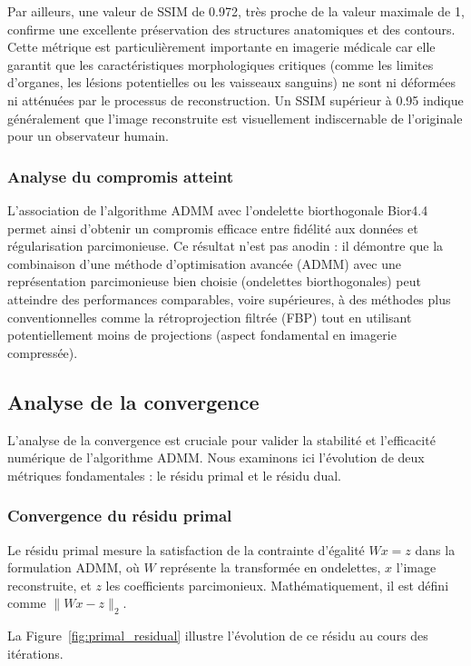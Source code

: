 Par ailleurs, une valeur de SSIM de 0.972, très proche de la valeur maximale de 1, confirme une excellente préservation des structures anatomiques et des contours. Cette métrique est particulièrement importante en imagerie médicale car elle garantit que les caractéristiques morphologiques critiques (comme les limites d'organes, les lésions potentielles ou les vaisseaux sanguins) ne sont ni déformées ni atténuées par le processus de reconstruction. Un SSIM supérieur à 0.95 indique généralement que l'image reconstruite est visuellement indiscernable de l'originale pour un observateur humain.

\subsubsection{Analyse du compromis atteint}
L'association de l'algorithme ADMM avec l'ondelette biorthogonale Bior4.4 permet ainsi d'obtenir un compromis efficace entre fidélité aux données et régularisation parcimonieuse. Ce résultat n'est pas anodin : il démontre que la combinaison d'une méthode d'optimisation avancée (ADMM) avec une représentation parcimonieuse bien choisie (ondelettes biorthogonales) peut atteindre des performances comparables, voire supérieures, à des méthodes plus conventionnelles comme la rétroprojection filtrée (FBP) tout en utilisant potentiellement moins de projections (aspect fondamental en imagerie compressée).

\subsection{Analyse de la convergence}

L'analyse de la convergence est cruciale pour valider la stabilité et l'efficacité numérique de l'algorithme ADMM. Nous examinons ici l'évolution de deux métriques fondamentales : le résidu primal et le résidu dual.

\subsubsection{Convergence du résidu primal}
Le résidu primal mesure la satisfaction de la contrainte d'égalité \( Wx = z \) dans la formulation ADMM, où \(W\) représente la transformée en ondelettes, \(x\) l'image reconstruite, et \(z\) les coefficients parcimonieux. Mathématiquement, il est défini comme \( \|Wx - z\|_2 \).

La Figure~\ref{fig:primal_residual} illustre l'évolution de ce résidu au cours des itérations.

